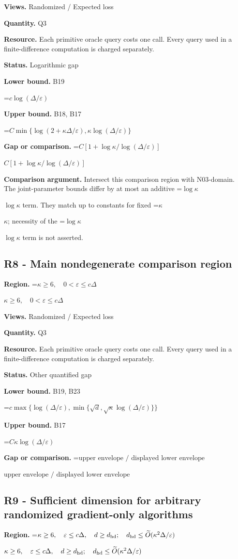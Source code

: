 \documentclass[10pt,a4paper]{article}
\newcommand{\AtlasMath}[1]{\par\begingroup\centering\setbox0=\hbox{$\displaystyle #1$}\ifdim\wd0>1.4\linewidth\typeout{ATLAS WIDE FORMULA: \the\wd0}\fi\ifdim\wd0>\linewidth\resizebox{\linewidth}{!}{\box0}\else\box0\fi\par\endgroup}
\newcommand{\AtlasInlineMath}[1]{\begingroup\setbox0=\hbox{$#1$}\ifdim\wd0>.4\linewidth\endgroup\AtlasMath{#1}\else\endgroup$#1$\fi}
\begin{document}
\textbf{Views.} Randomized / Expected loss

\textbf{Quantity.} Q3

\textbf{Resource.} Each primitive oracle query costs one call. Every query used in a finite-difference computation is charged separately.

\textbf{Status.} Logarithmic gap

\textbf{Lower bound.} B19

\AtlasMath{c\log(\Delta/\varepsilon)}
\textbf{Upper bound.} B18, B17

\AtlasMath{C\min\{\log(2+\kappa\Delta/\varepsilon),\kappa\log(\Delta/\varepsilon)\}}
\textbf{Gap or comparison.} \AtlasInlineMath{C[1+\log\kappa/\log(\Delta/\varepsilon)]}

\textbf{Comparison argument.} Intersect this comparison region with N03-domain. The joint-parameter bounds differ by at most an additive \AtlasInlineMath{\log\kappa} term. They match up to constants for fixed \AtlasInlineMath{\kappa}; necessity of the \AtlasInlineMath{\log\kappa} term is not asserted.

\subsection{R8 - Main nondegenerate comparison region}
\textbf{Region.} \AtlasInlineMath{\kappa\ge6,\quad0<\varepsilon\le c\Delta}

\textbf{Views.} Randomized / Expected loss

\textbf{Quantity.} Q3

\textbf{Resource.} Each primitive oracle query costs one call. Every query used in a finite-difference computation is charged separately.

\textbf{Status.} Other quantified gap

\textbf{Lower bound.} B19, B23

\AtlasMath{c\max\{\log(\Delta/\varepsilon),\min\{\sqrt d,\sqrt\kappa\log(\Delta/\varepsilon)\}\}}
\textbf{Upper bound.} B17

\AtlasMath{C\kappa\log(\Delta/\varepsilon)}
\textbf{Gap or comparison.} \AtlasInlineMath{\text{upper envelope / displayed lower envelope}}

\subsection{R9 - Sufficient dimension for arbitrary randomized gradient-only algorithms}
\textbf{Region.} \AtlasInlineMath{\kappa\ge6,\quad\varepsilon\le c\Delta,\quad d\ge d_{\rm hd};\quad d_{\rm hd}\le\widetilde{O}(\kappa^2\Delta/\varepsilon)}
\end{document}
